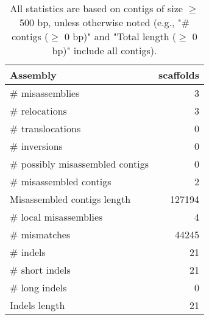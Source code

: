 \documentclass[12pt,a4paper]{article}
\begin{document}
\begin{table}[ht]
\begin{center}
\caption{All statistics are based on contigs of size $\geq$ 500 bp, unless otherwise noted (e.g., "\# contigs ($\geq$ 0 bp)" and "Total length ($\geq$ 0 bp)" include all contigs).}
\begin{tabular}{|l*{1}{|r}|}
\hline
Assembly & scaffolds \\ \hline
\# misassemblies & 3 \\ \hline
\hspace{5mm}\# relocations & 3 \\ \hline
\hspace{5mm}\# translocations & 0 \\ \hline
\hspace{5mm}\# inversions & 0 \\ \hline
\# possibly misassembled contigs & 0 \\ \hline
\# misassembled contigs & 2 \\ \hline
Misassembled contigs length & 127194 \\ \hline
\# local misassemblies & 4 \\ \hline
\# mismatches & 44245 \\ \hline
\# indels & 21 \\ \hline
\hspace{5mm}\# short indels & 21 \\ \hline
\hspace{5mm}\# long indels & 0 \\ \hline
Indels length & 21 \\ \hline
\end{tabular}
\end{center}
\end{table}
\end{document}
